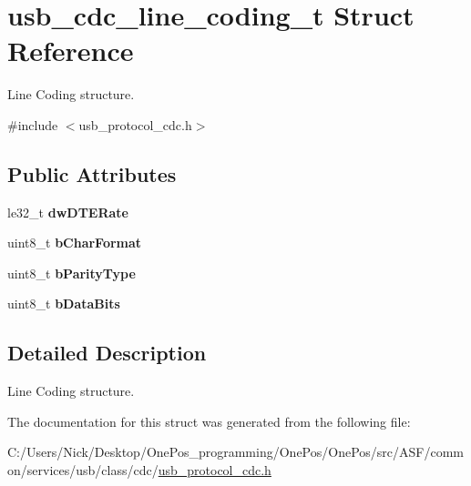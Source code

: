 \hypertarget{structusb__cdc__line__coding__t}{\section{usb\-\_\-cdc\-\_\-line\-\_\-coding\-\_\-t Struct Reference}
\label{structusb__cdc__line__coding__t}
}


Line Coding structure.  




{\ttfamily \#include $<$usb\-\_\-protocol\-\_\-cdc.\-h$>$}

\subsection*{Public Attributes}
\begin{DoxyCompactItemize}
\item 
\hypertarget{structusb__cdc__line__coding__t_ab49d8ed399997154486fa93af54f02c2}{le32\-\_\-t {\bfseries dw\-D\-T\-E\-Rate}}\label{structusb__cdc__line__coding__t_ab49d8ed399997154486fa93af54f02c2}

\item 
\hypertarget{structusb__cdc__line__coding__t_a7c8e804c8fc957f5a491c087ea35ea99}{uint8\-\_\-t {\bfseries b\-Char\-Format}}\label{structusb__cdc__line__coding__t_a7c8e804c8fc957f5a491c087ea35ea99}

\item 
\hypertarget{structusb__cdc__line__coding__t_ab7d9dd2aa31399d37950a840d24b9026}{uint8\-\_\-t {\bfseries b\-Parity\-Type}}\label{structusb__cdc__line__coding__t_ab7d9dd2aa31399d37950a840d24b9026}

\item 
\hypertarget{structusb__cdc__line__coding__t_a37561226b9715655f328b565c641bbc2}{uint8\-\_\-t {\bfseries b\-Data\-Bits}}\label{structusb__cdc__line__coding__t_a37561226b9715655f328b565c641bbc2}

\end{DoxyCompactItemize}


\subsection{Detailed Description}
Line Coding structure. 

The documentation for this struct was generated from the following file\-:\begin{DoxyCompactItemize}
\item 
C\-:/\-Users/\-Nick/\-Desktop/\-One\-Pos\-\_\-programming/\-One\-Pos/\-One\-Pos/src/\-A\-S\-F/common/services/usb/class/cdc/\hyperlink{usb__protocol__cdc_8h}{usb\-\_\-protocol\-\_\-cdc.\-h}\end{DoxyCompactItemize}
